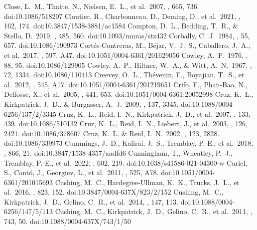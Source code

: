 \documentclass[twocolumn,tighten,twocolappendix]{aastex631}
\begin{document}
\begin{thebibliography}{}
 Close, L.~M., Thatte, N., Nielsen, E.~L., et al.\ 2007, \apj, 665, 736. doi:10.1086/518207
 Cloutier, R., Charbonneau, D., Deming, D., et al.\ 2021, \aj, 162, 174. doi:10.3847/1538-3881/ac1584
 Compton, D.~L., Bedding, T.~R., \& Stello, D.\ 2019, \mnras, 485, 560. doi:10.1093/mnras/stz432
 Corbally, C.~J.\ 1984, \apjs, 55, 657. doi:10.1086/190973
 Cort{\'e}s-Contreras, M., B{\'e}jar, V.~J.~S., Caballero, J.~A., et al.\ 2017, \aap, 597, A47. doi:10.1051/0004-6361/201629056
 Cowley, A.~P.\ 1976, \pasp, 88, 95. doi:10.1086/129905
 Cowley, A.~P., Hiltner, W.~A., \& Witt, A.~N.\ 1967, \aj, 72, 1334. doi:10.1086/110413
 Creevey, O.~L., Th{\'e}venin, F., Boyajian, T.~S., et al.\ 2012, \aap, 545, A17. doi:10.1051/0004-6361/201219651
 Crifo, F., Phan-Bao, N., Delfosse, X., et al.\ 2005, \aap, 441, 653. doi:10.1051/0004-6361:20052998
 Cruz, K.~L., Kirkpatrick, J.~D., \& Burgasser, A.~J.\ 2009, \aj, 137, 3345. doi:10.1088/0004-6256/137/2/3345
 Cruz, K.~L., Reid, I.~N., Kirkpatrick, J.~D., et al.\ 2007, \aj, 133, 439. doi:10.1086/510132
 Cruz, K.~L., Reid, I.~N., Liebert, J., et al.\ 2003, \aj, 126, 2421. doi:10.1086/378607
 Cruz, K.~L. \& Reid, I.~N.\ 2002, \aj, 123, 2828. doi:10.1086/339973
 Cummings, J.~D., Kalirai, J.~S., Tremblay, P.-E., et al.\ 2018, \apj, 866, 21. doi:10.3847/1538-4357/aadfd6
 Cunningham, T., Wheatley, P.~J., Tremblay, P.-E., et al.\ 2022, \nat, 602, 219. doi:10.1038/s41586-021-04300-w
 Curiel, S., Cant{\'o}, J., Georgiev, L., et al.\ 2011, \aap, 525, A78. doi:10.1051/0004-6361/201015693
 Cushing, M.~C., Hardegree-Ullman, K.~K., Trucks, J.~L., et al.\ 2016, \apj, 823, 152. doi:10.3847/0004-637X/823/2/152
 Cushing, M.~C., Kirkpatrick, J.~D., Gelino, C.~R., et al.\ 2014, \aj, 147, 113. doi:10.1088/0004-6256/147/5/113
 Cushing, M.~C., Kirkpatrick, J.~D., Gelino, C.~R., et al.\ 2011, \apj, 743, 50. doi:10.1088/0004-637X/743/1/50

\end{thebibliography}
\end{document}

